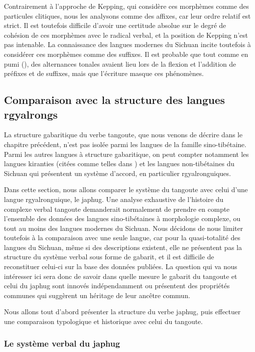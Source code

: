 \documentclass[oldfontcommands,twoside,a4paper,11pt,draft]{memoir}
\begin{document}
 Contrairement à l'approche de Kepping, qui considère ces morphèmes comme des particules clitiques, nous les analysons comme des affixes, car leur ordre relatif est  strict. Il est toutefois difficile d'avoir une certitude absolue sur le degré de cohésion de ces morphèmes avec le radical verbal, et la position de Kepping n'est pas intenable. La connaissance des langues modernes du Sichuan incite toutefois à considérer ces morphèmes comme  des suffixes. Il est probable  que tout comme en pumi (\citealt{jacques11pumi.tone}), des alternances tonales avaient lieu lors de la flexion et l'addition de préfixes et de suffixes, mais que l'écriture masque ces phénomènes.


 
\subsection{Comparaison avec la structure des langues rgyalrongs}
La structure gabaritique du verbe tangoute, que nous venons de décrire dans le chapitre précédent, n'est pas isolée parmi les langues de la famille sino-tibétaine. Parmi les autres langues à structure gabaritique, on peut compter notamment les langues kiranties (citées comme telles dans \citealt[218]{bickel07inflectional}) et les langues non-tibétaines du Sichuan qui présentent un système d'accord, en particulier rgyalronguiques.

Dans cette section, nous allons  comparer le système du tangoute avec celui d'une langue rgyalronguique, le japhug. Une analyse exhaustive de l'histoire du complexe verbal tangoute demanderait normalement de prendre en compte l'ensemble des données des langues sino-tibétaines à morphologie complexe, ou tout au moins des langues modernes du Sichuan. Nous décidons de nous limiter toutefois à la comparaison avec une seule langue, car pour la quasi-totalité des langues du Sichuan, même si des descriptions existent, elle ne présentent pas la structure du système verbal sous forme de gabarit, et il est difficile de reconstituer celui-ci sur la base des données publiées. La question qui va nous intéresser ici sera donc de savoir dans quelle mesure le gabarit du tangoute et celui du japhug sont innovés indépendamment ou présentent des propriétés communes qui suggèrent un héritage de leur ancêtre commun.

Nous allons tout d'abord présenter la structure du verbe japhug, puis effectuer une comparaison typologique et historique avec celui du tangoute.

\subsubsection{Le système verbal du japhug}
\end{document}
